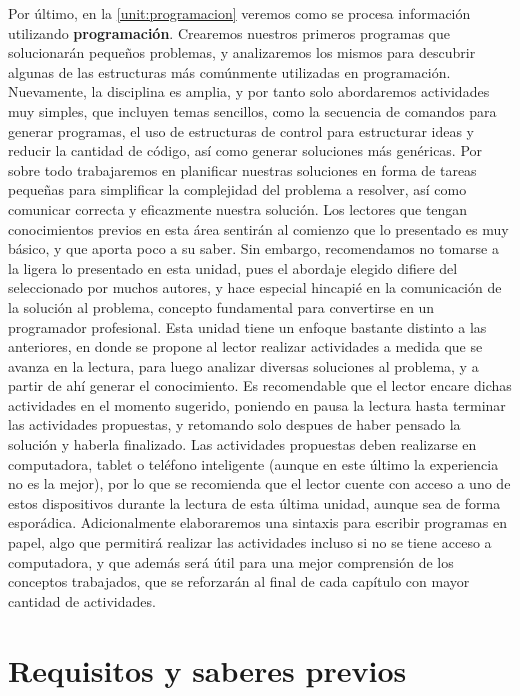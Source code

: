 Por último, en la \autoref{unit:programacion} veremos como se procesa
información utilizando \textbf{programación}. Crearemos nuestros primeros
programas que solucionarán pequeños problemas, y analizaremos los mismos para
descubrir algunas de las estructuras más comúnmente utilizadas en programación.
Nuevamente, la disciplina es amplia, y por tanto solo abordaremos actividades
muy simples, que incluyen temas sencillos, como la secuencia de comandos para
generar programas, el uso de estructuras de control para estructurar ideas y
reducir la cantidad de código, así como generar soluciones más genéricas. Por
sobre todo trabajaremos en planificar nuestras soluciones en forma de tareas
pequeñas para simplificar la complejidad del problema a resolver, así como
comunicar correcta y eficazmente nuestra solución. Los lectores que tengan
conocimientos previos en esta área sentirán al comienzo que lo presentado es muy
básico, y que aporta poco a su saber. Sin embargo, recomendamos no tomarse a la
ligera lo presentado en esta unidad, pues el abordaje elegido difiere del
seleccionado por muchos autores, y hace especial hincapié en la comunicación de
la solución al problema, concepto fundamental para convertirse en un programador
profesional. Esta unidad tiene un enfoque bastante distinto a las anteriores, en
donde se propone al lector realizar actividades a medida que se avanza en la
lectura, para luego analizar diversas soluciones al problema, y a partir de ahí
generar el conocimiento. Es recomendable que el lector encare dichas actividades
en el momento sugerido, poniendo en pausa la lectura hasta terminar las
actividades propuestas, y retomando solo despues de haber pensado la solución y
haberla finalizado. Las actividades propuestas deben realizarse en computadora,
tablet o teléfono inteligente (aunque en este último la experiencia no es la
mejor), por lo que se recomienda que el lector cuente con acceso a uno de estos
dispositivos durante la lectura de esta última unidad, aunque sea de forma
esporádica. Adicionalmente elaboraremos una sintaxis para escribir programas en
papel, algo que permitirá realizar las actividades incluso si no se tiene acceso
a computadora, y que además será útil para una mejor comprensión de los
conceptos trabajados, que se reforzarán al final de cada capítulo con mayor
cantidad de actividades.

\section*{Requisitos y saberes previos}

